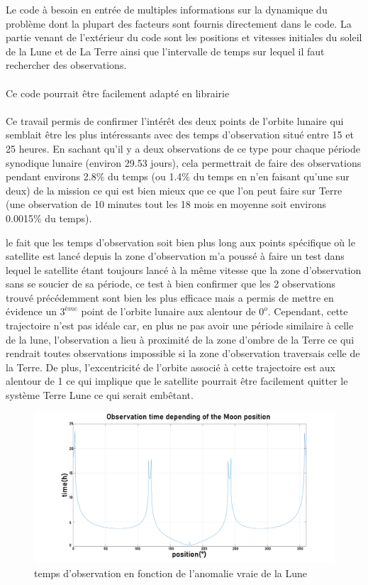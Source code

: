 \documentclass{article} %
\begin{document}
		Le code à besoin en entrée de multiples informations sur la dynamique du problème dont la plupart des facteurs sont fournis directement dans le code. La partie venant de l'extérieur du code sont les positions et vitesses initiales du soleil de la Lune et de La Terre ainsi que l'intervalle de temps sur lequel il faut rechercher des observations.
		\\ \\
		Ce code pourrait être facilement adapté en librairie
		\\ \\	
		Ce travail permis de confirmer l'intérêt des deux points de l'orbite lunaire qui semblait être les plus intéressants avec des temps d'observation situé entre 15 et 25 heures. En sachant qu'il y a deux observations de ce type pour chaque période synodique lunaire (environ 29.53 jours), cela permettrait de faire des observations pendant environs 2.8\% du temps (ou 1.4\% du temps en n'en faisant qu'une sur deux) de la mission ce qui est bien mieux que ce que l'on peut faire sur Terre (une observation de 10 minutes tout les 18 mois en moyenne soit environs 0.0015\% du temps).
		
		le fait que les temps d'observation soit bien plus long aux points spécifique où le satellite est lancé depuis la zone d'observation m'a poussé à faire un test dans lequel le satellite étant toujours lancé à la même vitesse que la zone d'observation sans se soucier de sa période, ce test à bien confirmer que les 2 observations trouvé précédemment sont bien les plus efficace mais a permis de mettre en évidence un $3^{ème}$ point de l'orbite lunaire aux alentour de $0^o$. Cependant, cette trajectoire n'est pas idéale car, en plus ne pas avoir une période similaire à celle de la lune, l'observation a lieu à proximité de la zone d'ombre de la Terre ce qui rendrait toutes observations impossible si la zone d'observation traversais celle de la Terre. De plus, l'excentricité de l'orbite associé à cette trajectoire est aux alentour de 1 ce qui implique que le satellite pourrait être facilement quitter le système Terre Lune ce qui serait embêtant.
		\begin{figure}[h]
			\includegraphics[width=1\textwidth]{images/observation_Obs.png}
			\caption{temps d'observation en fonction de l'anomalie vraie de la Lune}
		\end{figure}
		
\end{document}
